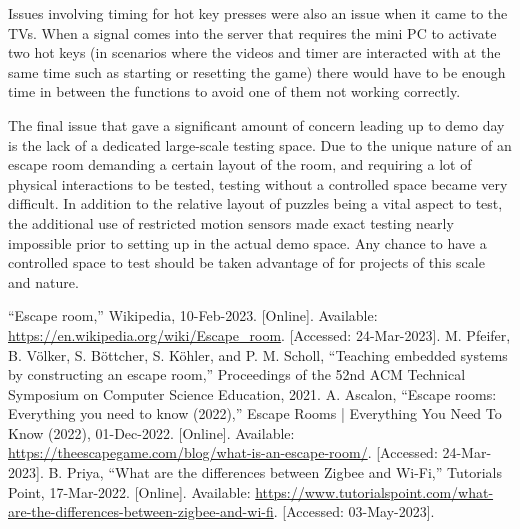 \documentclass[conference]{IEEEtran}
\begin{document}
\indent Issues involving timing for hot key presses were also an issue when it came to the TVs. When a signal comes 
into the server that requires the mini PC to activate two hot keys (in scenarios where the videos 
and timer are interacted with at the same time such as starting or resetting the game) there would have to be enough time in between the 
functions to avoid one of them not working correctly.

\indent The final issue that gave a significant amount of concern leading up to demo day is the lack of a dedicated large-scale 
testing space. Due to the unique nature of an escape room demanding a certain layout of the room, and requiring a lot of physical 
interactions to be tested, testing without a controlled space became very difficult. In addition to the relative layout of puzzles 
being a vital aspect to test, the additional use of restricted motion sensors made exact testing nearly impossible prior 
to setting up in the actual demo space. Any chance to have a controlled space to test should be taken advantage of for 
projects of this scale and nature.

\begin{thebibliography}{00}

     “Escape room,” Wikipedia, 10-Feb-2023. [Online]. Available: \url{https://en.wikipedia.org/wiki/Escape_room}. [Accessed: 24-Mar-2023].
     M. Pfeifer, B. Völker, S. Böttcher, S. Köhler, and P. M. Scholl, “Teaching embedded systems by constructing an escape room,” Proceedings of the 52nd ACM Technical Symposium on Computer Science Education, 2021.    
     A. Ascalon, “Escape rooms: Everything you need to know (2022),” Escape Rooms | Everything You Need To Know (2022), 01-Dec-2022. [Online]. Available:  \url{https://theescapegame.com/blog/what-is-an-escape-room/}. [Accessed: 24-Mar-2023].
     B. Priya, “What are the differences between Zigbee and Wi-Fi,” Tutorials Point, 17-Mar-2022. [Online]. Available: \url{https://www.tutorialspoint.com/what-are-the-differences-between-zigbee-and-wi-fi}. [Accessed: 03-May-2023].

\end{thebibliography}
\end{document}
